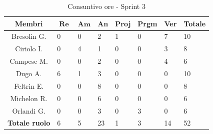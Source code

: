 \documentclass[10pt, a4paper]{article}
\begin{document}
\begin{table}[H]
    \begin{tabularx}{\textwidth}{c|X|X|X|X|X|X|X}
        \textbf{Membri} & $\operatorname{\textbf{Re}}$ & $\mathrm{\textbf{Am}}$ & \textbf{An} & \textbf{Proj} & \textbf{Prgm} & \textbf{Ver} & \textbf{Totale} \\
        \hline Bresolin G. & 0 & 0 & 2 & 1 & 0 & 7 & 10 \\
        \hline Ciriolo I.  & 0 & 4 & 1 & 0 & 0 & 3 & 8 \\
        \hline Campese M.  & 0 & 0 & 2 & 0 & 0 & 4 & 6 \\
        \hline Dugo A.     & 6 & 1 & 3 & 0 & 0 & 0 & 10 \\
        \hline Feltrin E.  & 0 & 0 & 8 & 0 & 0 & 0 & 8 \\
        \hline Michelon R. & 0 & 0 & 6 & 0 & 0 & 0 & 6 \\
        \hline Orlandi G.  & 0 & 0 & 3 & 0 & 3 & 0 & 6 \\
        \hline
        \textbf{Totale ruolo} & 6 & 5 & 23 & 1 & 3 & 14 & 52 
    \end{tabularx}
    \caption{Consuntivo ore - Sprint 3}
\end{table}
\end{document}
